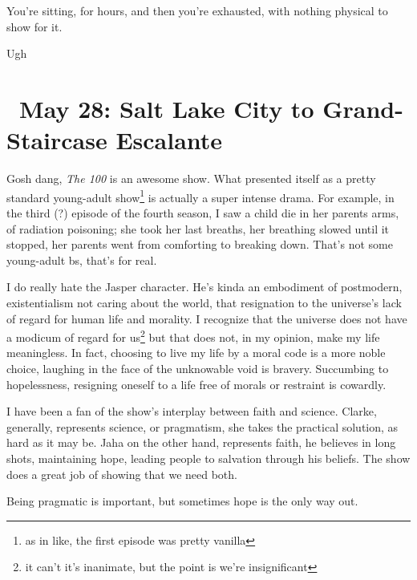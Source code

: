 \documentclass[../butidigress.tex]{subfiles}
\begin{document}
You're sitting, for hours, and then you're exhausted, with nothing physical to show for it.

\entryskip

Ugh

\section{\ May 28: Salt Lake City to Grand-Staircase Escalante}

Gosh dang, \textit{The 100} is an awesome show.
What presented itself as a pretty standard young-adult show\footnote{as in like, the first episode was pretty vanilla} is actually a super intense drama.
For example, in the third (?) episode of the fourth season, I saw a child die in her parents arms, of radiation poisoning; she took her last breaths, her breathing slowed until it stopped, her parents went from comforting to breaking down.
That's not some young-adult bs, that's for real.

I do really hate the Jasper character.
He's kinda an embodiment of postmodern, existentialism not caring about the world, that resignation to the universe's lack of regard for human life and morality.
I recognize that the universe does not have a modicum of regard for us\footnote{it can't it's inanimate, but the point is we're insignificant} but that does not, in my opinion, make my life meaningless.
In fact, choosing to live my life by a moral code is a more noble choice, laughing in the face of the unknowable void is bravery.
Succumbing to hopelessness, resigning oneself to a life free of morals or restraint is cowardly.

I have been a fan of the show's interplay between faith and science.
Clarke, generally, represents science, or pragmatism, she takes the practical solution, as hard as it may be.
Jaha on the other hand, represents faith, he believes in long shots, maintaining hope, leading people to salvation through his beliefs.
The show does a great job of showing that we need both.

Being pragmatic is important, but sometimes hope is the only way out.

\renewcommand{\thesection}{\thechapter .\arabic{section}}

\newlength{\episkip}
\setlength{\episkip}{0.5cm}
\newcommand{\postepi}{\vspace{\episkip}\noindent\hfill\rule{0.5\textwidth}{1pt}\hfill\vspace{\episkip}}
\end{document}
